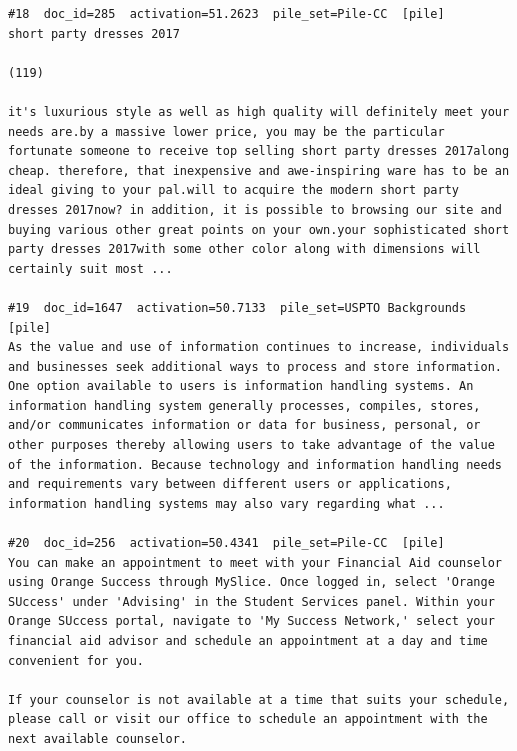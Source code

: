 \begin{verbatim}
#18  doc_id=285  activation=51.2623  pile_set=Pile-CC  [pile]
short party dresses 2017

(119)

it's luxurious style as well as high quality will definitely meet your needs are.by a massive lower price, you may be the particular fortunate someone to receive top selling short party dresses 2017along cheap. therefore, that inexpensive and awe-inspiring ware has to be an ideal giving to your pal.will to acquire the modern short party dresses 2017now? in addition, it is possible to browsing our site and buying various other great points on your own.your sophisticated short party dresses 2017with some other color along with dimensions will certainly suit most ...

#19  doc_id=1647  activation=50.7133  pile_set=USPTO Backgrounds  [pile]
As the value and use of information continues to increase, individuals and businesses seek additional ways to process and store information. One option available to users is information handling systems. An information handling system generally processes, compiles, stores, and/or communicates information or data for business, personal, or other purposes thereby allowing users to take advantage of the value of the information. Because technology and information handling needs and requirements vary between different users or applications, information handling systems may also vary regarding what ...

#20  doc_id=256  activation=50.4341  pile_set=Pile-CC  [pile]
You can make an appointment to meet with your Financial Aid counselor using Orange Success through MySlice. Once logged in, select 'Orange SUccess' under 'Advising' in the Student Services panel. Within your Orange SUccess portal, navigate to 'My Success Network,' select your financial aid advisor and schedule an appointment at a day and time convenient for you.

If your counselor is not available at a time that suits your schedule, please call or visit our office to schedule an appointment with the next available counselor.

\end{verbatim}

